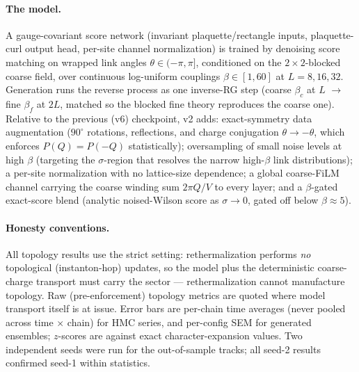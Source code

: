 \paragraph{The model.} A gauge-covariant score network (invariant
plaquette/rectangle inputs, plaquette-curl output head, per-site channel
normalization) is trained by denoising score matching on wrapped link angles
$\theta \in (-\pi,\pi]$, conditioned on the $2\times 2$-blocked coarse
field, over continuous log-uniform couplings $\beta \in [1, 60]$ at
$L = 8, 16, 32$. Generation runs the reverse process as one inverse-RG step
(coarse $\beta_c$ at $L$ $\to$ fine $\beta_f$ at $2L$, matched so the
blocked fine theory reproduces the coarse one). Relative to the previous
(v6) checkpoint, v2 adds: exact-symmetry data augmentation ($90^\circ$
rotations, reflections, and charge conjugation $\theta \to -\theta$, which
enforces $P(Q) = P(-Q)$ statistically); oversampling of small noise levels
at high $\beta$ (targeting the $\sigma$-region that resolves the narrow
high-$\beta$ link distributions); a per-site normalization with no
lattice-size dependence; a global coarse-FiLM channel carrying the coarse
winding sum $2\pi Q/V$ to every layer; and a $\beta$-gated exact-score
blend (analytic noised-Wilson score as $\sigma \to 0$, gated off below
$\beta \approx 5$).

\paragraph{Honesty conventions.} All topology results use the strict
setting: rethermalization performs \emph{no} topological (instanton-hop)
updates, so the model plus the deterministic coarse-charge transport must
carry the sector --- rethermalization cannot manufacture topology. Raw
(pre-enforcement) topology metrics are quoted where model transport itself
is at issue. Error bars are per-chain time averages (never pooled across
time $\times$ chain) for HMC series, and per-config SEM for generated
ensembles; $z$-scores are against exact character-expansion values. Two
independent seeds were run for the out-of-sample tracks; all seed-2 results
confirmed seed-1 within statistics.

